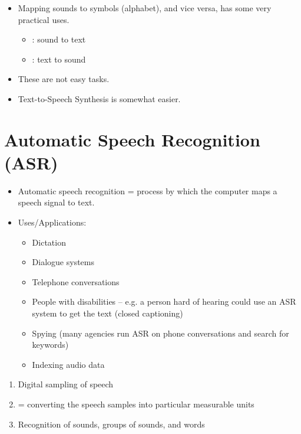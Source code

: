 \documentclass[a4paper,landscape,headrule,footrule,xetex]{foils}
\begin{document}


\begin{itemize}
\item Mapping sounds to symbols (alphabet), and vice versa, has some very practical uses.
  \begin{itemize}
  \item {}: sound to text
  \item {}: text to sound
  \end{itemize}
\item These are not easy tasks.
\item Text-to-Speech Synthesis is somewhat easier.
\end{itemize}

\section{Automatic Speech Recognition (ASR)}


\begin{itemize}
\item Automatic speech recognition = process by which the computer maps a speech signal to text.
\item Uses/Applications:
  \begin{itemize}
  \item Dictation
  \item Dialogue systems
  \item Telephone conversations
  \item People with disabilities – e.g. a person hard of hearing could use an ASR system to get the text (closed captioning)
  \item Spying (many agencies run ASR on phone conversations and search for keywords)
  \item Indexing audio data
  \end{itemize}
\end{itemize}









\begin{enumerate}
\item Digital sampling of speech
\item {} = converting the speech samples into particular measurable units
\item Recognition of sounds, groups of sounds, and words 
\end{enumerate}
\end{document}
